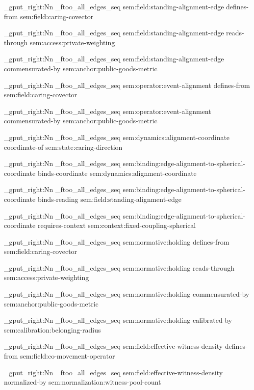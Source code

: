 \seq_gput_right:Nn \g_ftoo_all_edges_seq { { sem:field:standing-alignment-edge } { defines-from } { sem:field:caring-covector } }

\seq_gput_right:Nn \g_ftoo_all_edges_seq { { sem:field:standing-alignment-edge } { reads-through } { sem:access:private-weighting } }

\seq_gput_right:Nn \g_ftoo_all_edges_seq { { sem:field:standing-alignment-edge } { commensurated-by } { sem:anchor:public-goods-metric } }

\seq_gput_right:Nn \g_ftoo_all_edges_seq { { sem:operator:event-alignment } { defines-from } { sem:field:caring-covector } }

\seq_gput_right:Nn \g_ftoo_all_edges_seq { { sem:operator:event-alignment } { commensurated-by } { sem:anchor:public-goods-metric } }

\seq_gput_right:Nn \g_ftoo_all_edges_seq { { sem:dynamics:alignment-coordinate } { coordinate-of } { sem:state:caring-direction } }

\seq_gput_right:Nn \g_ftoo_all_edges_seq { { sem:binding:edge-alignment-to-spherical-coordinate } { binds-coordinate } { sem:dynamics:alignment-coordinate } }

\seq_gput_right:Nn \g_ftoo_all_edges_seq { { sem:binding:edge-alignment-to-spherical-coordinate } { binds-reading } { sem:field:standing-alignment-edge } }

\seq_gput_right:Nn \g_ftoo_all_edges_seq { { sem:binding:edge-alignment-to-spherical-coordinate } { requires-context } { sem:context:fixed-coupling-spherical } }

\seq_gput_right:Nn \g_ftoo_all_edges_seq { { sem:normative:holding } { defines-from } { sem:field:caring-covector } }

\seq_gput_right:Nn \g_ftoo_all_edges_seq { { sem:normative:holding } { reads-through } { sem:access:private-weighting } }

\seq_gput_right:Nn \g_ftoo_all_edges_seq { { sem:normative:holding } { commensurated-by } { sem:anchor:public-goods-metric } }

\seq_gput_right:Nn \g_ftoo_all_edges_seq { { sem:normative:holding } { calibrated-by } { sem:calibration:belonging-radius } }

\seq_gput_right:Nn \g_ftoo_all_edges_seq { { sem:field:effective-witness-density } { defines-from } { sem:field:co-movement-operator } }

\seq_gput_right:Nn \g_ftoo_all_edges_seq { { sem:field:effective-witness-density } { normalized-by } { sem:normalization:witness-pool-count } }

